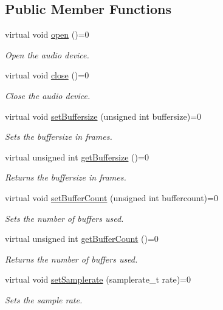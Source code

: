 \subsection*{Public Member Functions}
\begin{DoxyCompactItemize}
\item 
virtual void \hyperlink{group__Audio_ga3da276862af02fe20717d07527eb2a3f}{open} ()=0
\begin{DoxyCompactList}\small\item\em Open the audio device. \end{DoxyCompactList}\item 
virtual void \hyperlink{group__Audio_gab8bf0d58ba2f88514c7d6b1756678175}{close} ()=0
\begin{DoxyCompactList}\small\item\em Close the audio device. \end{DoxyCompactList}\item 
virtual void \hyperlink{group__Audio_gad8e03febba94313406f192d7d70eb109}{set\-Buffersize} (unsigned int buffersize)=0
\begin{DoxyCompactList}\small\item\em Sets the buffersize in frames. \end{DoxyCompactList}\item 
virtual unsigned int \hyperlink{group__Audio_ga2e3c5209b59e9abe5dd7d04dfef301cb}{get\-Buffersize} ()=0
\begin{DoxyCompactList}\small\item\em Returns the buffersize in frames. \end{DoxyCompactList}\item 
virtual void \hyperlink{group__Audio_ga9cca4b557c979fb6bb8c5a7b8978904d}{set\-Buffer\-Count} (unsigned int buffercount)=0
\begin{DoxyCompactList}\small\item\em Sets the number of buffers used. \end{DoxyCompactList}\item 
virtual unsigned int \hyperlink{group__Audio_gaf133dbf0605d95370f745d6d0e7373dc}{get\-Buffer\-Count} ()=0
\begin{DoxyCompactList}\small\item\em Returns the number of buffers used. \end{DoxyCompactList}\item 
virtual void \hyperlink{group__Audio_ga4aa2440aca1c97e4776c789432f37306}{set\-Samplerate} (samplerate\-\_\-t rate)=0
\begin{DoxyCompactList}\small\item\em Sets the sample rate. \end{DoxyCompactList}\item 

\end{DoxyCompactItemize}
